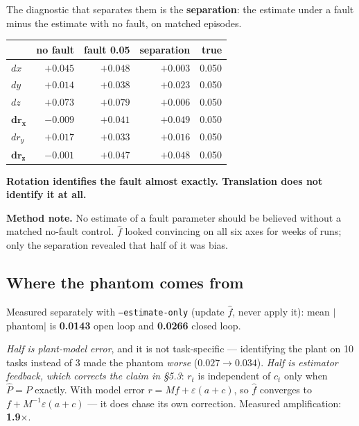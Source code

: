 \documentclass[11pt,a4paper]{article}
\newcommand{\code}[1]{\texttt{\small #1}}
\newcommand{\fhat}{\hat{f}}
\begin{document}
The diagnostic that separates them is the \textbf{separation}: the estimate under
a fault minus the estimate with no fault, on matched episodes.

\begin{center}
\begin{tabular}{lrrrr}
\toprule
 & \textbf{no fault} & \textbf{fault 0.05} & \textbf{separation} & \textbf{true} \\
\midrule
$dx$    & $+0.045$ & $+0.048$ & $\mathbf{+0.003}$ & 0.050 \\
$dy$    & $+0.014$ & $+0.038$ & $+0.023$ & 0.050 \\
$dz$    & $+0.073$ & $+0.079$ & $\mathbf{+0.006}$ & 0.050 \\
$\mathbf{d r_x}$ & $-0.009$ & $+0.041$ & $\mathbf{+0.049}$ & 0.050 \\
$d r_y$ & $+0.017$ & $+0.033$ & $+0.016$ & 0.050 \\
$\mathbf{d r_z}$ & $-0.001$ & $+0.047$ & $\mathbf{+0.048}$ & 0.050 \\
\bottomrule
\end{tabular}
\end{center}

\textbf{Rotation identifies the fault almost exactly. Translation does not
identify it at all.}

\begin{tcolorbox}[colback=gray!6,colframe=gray!55!black]
\textbf{Method note.} No estimate of a fault parameter should be believed without
a matched no-fault control. $\fhat$ looked convincing on all six axes for weeks
of runs; only the separation revealed that half of it was bias.
\end{tcolorbox}

\subsection{Where the phantom comes from}

Measured separately with \code{--estimate-only} (update $\fhat$, never apply it):
mean $|$phantom$|$ is \textbf{0.0143} open loop and \textbf{0.0266} closed loop.

\emph{Half is plant-model error}, and it is not task-specific --- identifying the
plant on 10 tasks instead of 3 made the phantom \emph{worse} ($0.027 \to 0.034$).
\emph{Half is estimator feedback, which corrects the claim in \S5.3}: $r_t$ is
independent of $c_t$ only when $\hat P = P$ exactly. With model error
$r = Mf + \varepsilon(a+c)$, so $\fhat$ converges to $f + M^{-1}\varepsilon(a+c)$
--- it does chase its own correction. Measured amplification: \textbf{1.9$\times$}.
\end{document}
